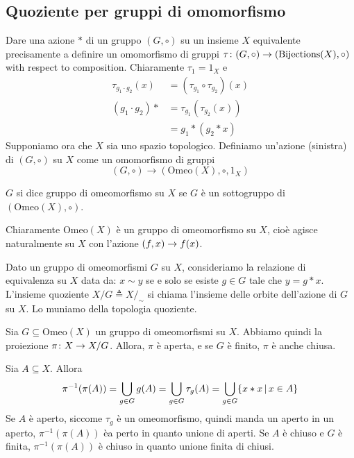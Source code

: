 \documentclass[a4paper]{article}
\begin{document}
\subsection{Quoziente per gruppi di omomorfismo}

Dare una azione \(\ast\) di un gruppo \((G, \circ)\) su un insieme \(X\)
equivalente precisamente a definire un omomorfismo di gruppi
\(\tau \colon (G, \circ) \to (\text{Bijections}(X), \circ)\) with respect to composition.
Chiaramente \(\tau_1 = 1_X\) e
\begin{align*}
    \tau_{g_1 \cdot g_2}(x) &= (\tau_{g_1} \circ \tau_{g_2})(x) \\
    (g_1 \cdot g_2) \ast &= \tau_{g_1} (\tau_{g_2}(x)) \\
    &= g_1 \ast (g_2 \ast x)
\end{align*}
Supponiamo ora che \(X\) sia uno spazio topologico.
Definiamo un'azione (sinistra) di \((G, \circ)\) su \(X\) come un omomorfismo di gruppi
\[
    (G, \circ) \to (\text{Omeo}(X), \circ, 1_X)
\]

\begin{snippetdefinition}{}
    \(G\) si dice gruppo di omeomorfismo su \(X\)
    se \(G\) è un sottogruppo di \((\text{Omeo}(X), \circ)\).
\end{snippetdefinition}

Chiaramente \(\text{Omeo}(X)\) è un gruppo di omeomorfismo su \(X\),
cioè agisce naturalmente su \(X\) con l'azione \((f, x) \to f(x)\).

Dato un gruppo di omeomorfismi \(G\) su \(X\), consideriamo la relazione di equivalenza
su \(X\) data da: \(x\sim y\) se e solo se esiste \(g \in G\) tale che
\(y = g \ast x\).
L'insieme quoziente \(X/G \triangleq X/_\sim\) si chiama
l'insieme delle orbite dell'azione di \(G\) su \(X\).
Lo muniamo della topologia quoziente.

\begin{snippetproposition}{}
    Sia \(G \subseteq \text{Omeo}(X)\) un gruppo di omeomorfismi su \(X\).
    Abbiamo quindi la proiezione \(\pi \colon X \to X/G\).
    Allora, \(\pi\) è aperta, e se \(G\) è finito, \(\pi\) è anche chiusa.
\end{snippetproposition}

\begin{snippetproof}{}
    Sia \(A \subseteq X\).
    Allora \begin{align*}
        \pi^{-1}(\pi(A)) = \bigcup_{g\in G} g(A) = \bigcup_{g\in G} \tau_g(A)
        = \bigcup_{g\in G} \{x \ast x \,|\, x\in A\}
    \end{align*}
    Se \(A\) è aperto, siccome \(\tau_g\) è un omeomorfismo, quindi manda un aperto in un aperto,
    \(\pi^{-1}(\pi(A))\) èa perto in quanto unione di aperti.
    Se \(A\) è chiuso e \(G\) è finita, \(\pi^{-1}(\pi(A))\) è chiuso in quanto unione finita di chiusi.
\end{snippetproof}
\end{document}
